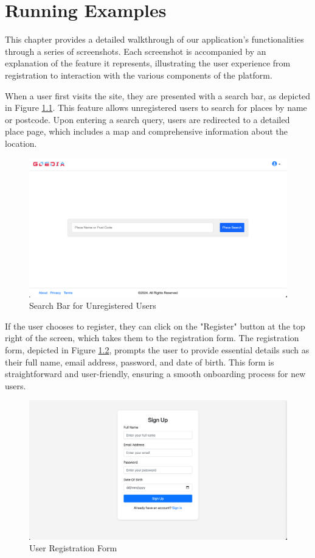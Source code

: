 \chapter{Running Examples}

This chapter provides a detailed walkthrough of our application's functionalities through a series of screenshots. Each screenshot is accompanied by an explanation of the feature it represents, illustrating the user experience from registration to interaction with the various components of the platform.

When a user first visits the site, they are presented with a search bar, as depicted in Figure \ref{fig:searchbar}. This feature allows unregistered users to search for places by name or postcode. Upon entering a search query, users are redirected to a detailed place page, which includes a map and comprehensive information about the location.

\begin{figure}[H]
    \centering
    \includegraphics[width=\textwidth]{searchbar.png}
    \caption{Search Bar for Unregistered Users}
    \label{fig:searchbar}
\end{figure}

If the user chooses to register, they can click on the "Register" button at the top right of the screen, which takes them to the registration form. The registration form, depicted in Figure \ref{fig:signup}, prompts the user to provide essential details such as their full name, email address, password, and date of birth. This form is straightforward and user-friendly, ensuring a smooth onboarding process for new users.

\begin{figure}[H]
    \centering
    \includegraphics[width=\textwidth]{signup.png}
    \caption{User Registration Form}
    \label{fig:signup}
\end{figure}

